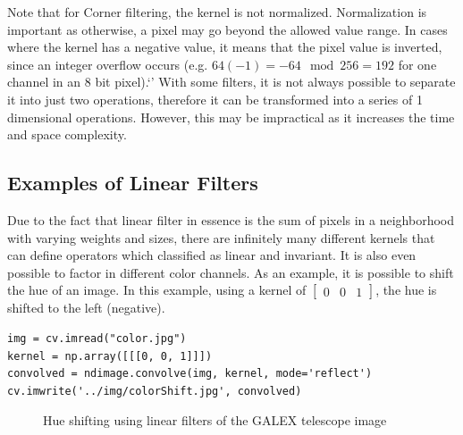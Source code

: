 \documentclass[twoside,a4paper,article]{combine}
\begin{document}
Note that for Corner filtering, the kernel is not normalized. Normalization is important as otherwise, a pixel may go beyond the allowed value range.
In cases where the kernel has a negative value, it means that the pixel value is inverted, since an integer overflow occurs (e.g. $64
(-1)= -64 \mod 256 = 192$ for one channel in an 8 bit pixel).`'
With some filters, it is not always possible to separate it into just two operations, therefore it can be
transformed into a series of 1 dimensional operations. However, this may be impractical as it increases the time and space
complexity.

\subsection{Examples of Linear Filters}
Due to the fact that linear filter in essence is the sum of pixels in a neighborhood with varying weights and sizes, there are infinitely many different kernels that can
define operators which classified as linear and invariant. It is also even possible to factor in different color channels. As an example, it is possible to shift the hue of an image.
In this example, using a kernel of $\begin{bmatrix}0 & 0 & 1\end{bmatrix}$, the hue is shifted to the left (negative).
\lstset{language=Python}
\begin{lstlisting}
img = cv.imread("color.jpg")
kernel = np.array([[[0, 0, 1]]])
convolved = ndimage.convolve(img, kernel, mode='reflect')
cv.imwrite('../img/colorShift.jpg', convolved)
\end{lstlisting}


\begin{minipage}{\textwidth}\begin{figure}[H]
    \captionsetup{justification=centering}
    \centering
    \caption{Hue shifting using linear filters of the GALEX telescope image\cite{NASA_on_The_Commons_23}}
    \label{fig:hueshift}
\end{figure}\end{minipage}
\end{document}
